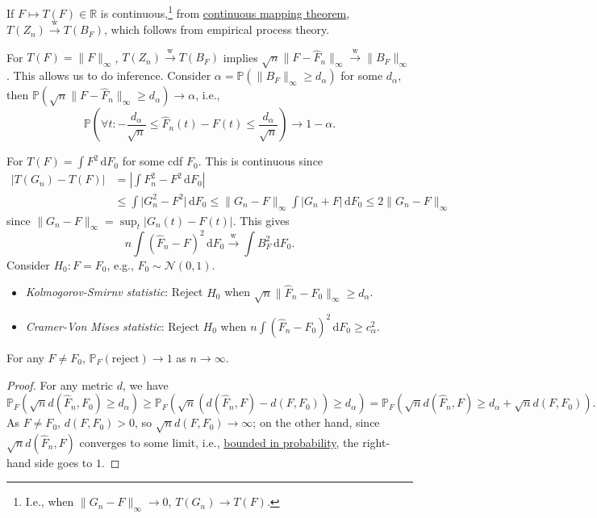 If \(F \mapsto T(F) \in \mathbb{R} \) is continuous,\footnote{I.e., when \(\lVert G_n - F \rVert _\infty \to 0\), \(T(G_n) \to T(F)\).} from \hyperref[thm:continuous-mapping]{continuous mapping theorem}, \(T(Z_n) \overset{\text{w} }{\to} T(B_F)\), which follows from empirical process theory.

\begin{eg}
	For \(T(F) = \lVert F \rVert _\infty \), \(T(Z_n) \overset{\text{w} }{\to} T(B_F)\) implies \(\sqrt{n} \lVert F - \hat{F} _n \rVert _\infty \overset{\text{w} }{\to} \lVert B_F \rVert _\infty\). This allows us to do inference. Consider \(\alpha = \mathbb{P} (\lVert B_F \rVert _\infty \geq d_\alpha )\) for some \(d_\alpha \), then \(\mathbb{P} (\sqrt{n} \lVert F - \hat{F} _n \rVert _\infty \geq d_\alpha ) \to \alpha\), i.e.,
	\[
		\mathbb{P} \left(\forall t \colon - \frac{d_\alpha }{\sqrt{n} } \leq \hat{F} _n(t) - F(t) \leq \frac{d_\alpha }{\sqrt{n} } \right) \to 1 - \alpha .
	\]
\end{eg}

\begin{eg}
	For \(T(F) = \int F^2 \,\mathrm{d} F_0\) for some cdf \(F_0\). This is continuous since
	\[
		\begin{split}
			\vert T(G_n) - T(F) \vert
			 & = \left\vert \int F^2_n - F^2 \,\mathrm{d} F_0 \right\vert \\
			 & \leq \int \vert G_n^2 - F^2 \vert \,\mathrm{d} F_0
			\leq \lVert G_n - F \rVert _\infty \int \vert G_n + F \vert \,\mathrm{d} F_0
			\leq 2 \lVert G_n - F \rVert _\infty
		\end{split}
	\]
	since \(\lVert G_n - F \rVert _\infty = \sup _t \vert G_n(t) - F(t) \vert \). This gives
	\[
		n \int (\hat{F} _n - F)^2 \,\mathrm{d} F_0
		\overset{\text{w} }{\to} \int B_F^2 \,\mathrm{d} F_0.
	\]
	Consider \(H_0 \colon F = F_0\), e.g., \(F_0 \sim \mathcal{N} (0, 1)\).
	\begin{itemize}
		\item \emph{Kolmogorov-Smirnv statistic}: Reject \(H_0\) when \(\sqrt{n} \lVert \hat{F} _n - F_0 \rVert _\infty \geq d_\alpha \).
		\item \emph{Cramer-Von Mises statistic}: Reject \(H_0\) when \(n \int (\hat{F} _n - F_0)^2 \,\mathrm{d} F_0 \geq c_\alpha ^2\).
	\end{itemize}
\end{eg}

\begin{proposition}
	For any \(F \neq F_0\), \(\mathbb{P} _F(\text{reject} ) \to 1\) as \(n \to \infty \).
\end{proposition}
\begin{proof}
	For any metric \(d\), we have
	\[
		\mathbb{P} _F (\sqrt{n} d(\hat{F} _n, F_0) \geq d_\alpha )
		\geq \mathbb{P} _F(\sqrt{n} (d(\hat{F} _n, F) - d(F, F_0))\geq d_\alpha )
		= \mathbb{P} _F(\sqrt{n} d(\hat{F} _n, F) \geq d_\alpha + \sqrt{n} d(F, F_0)).
	\]
	As \(F \neq F_0\), \(d(F, F_0) > 0\), so \(\sqrt{n} d(F, F_0) \to \infty \); on the other hand, since \(\sqrt{n} d(\hat{F} _n, F)\) converges to some limit, i.e., \hyperref[def:bounded-in-probability]{bounded in probability}, the right-hand side goes to \(1\).
\end{proof}

